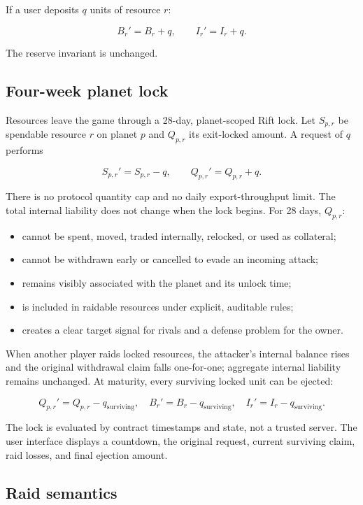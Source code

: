 \documentclass[11pt]{article}
\begin{document}
If a user deposits $q$ units of resource $r$:

\[
B_r' = B_r+q,\qquad I_r'=I_r+q.
\]

The reserve invariant is unchanged.

\subsection{Four-week planet lock}

Resources leave the game through a 28-day, planet-scoped Rift lock. Let $S_{p,r}$ be spendable resource $r$ on planet $p$ and $Q_{p,r}$ its exit-locked amount. A request of $q$ performs

\[
S_{p,r}'=S_{p,r}-q,\qquad Q_{p,r}'=Q_{p,r}+q.
\]

There is no protocol quantity cap and no daily export-throughput limit. The total internal liability does not change when the lock begins. For 28 days, $Q_{p,r}$:

\begin{itemize}
  \item cannot be spent, moved, traded internally, relocked, or used as collateral;
  \item cannot be withdrawn early or cancelled to evade an incoming attack;
  \item remains visibly associated with the planet and its unlock time;
  \item is included in raidable resources under explicit, auditable rules;
  \item creates a clear target signal for rivals and a defense problem for the owner.
\end{itemize}

When another player raids locked resources, the attacker's internal balance rises and the original withdrawal claim falls one-for-one; aggregate internal liability remains unchanged. At maturity, every surviving locked unit can be ejected:

\[
Q_{p,r}'=Q_{p,r}-q_{\mathrm{surviving}},\quad
B_r'=B_r-q_{\mathrm{surviving}},\quad
I_r'=I_r-q_{\mathrm{surviving}}.
\]

The lock is evaluated by contract timestamps and state, not a trusted server. The user interface displays a countdown, the original request, current surviving claim, raid losses, and final ejection amount.

\subsection{Raid semantics}
\end{document}
